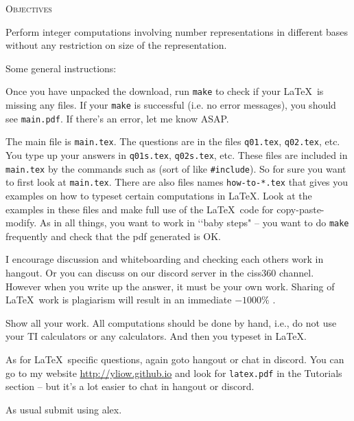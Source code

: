 \textsc{Objectives}
\begin{enumerate}
\li Perform integer computations involving number
representations in different bases without any restriction on size of the
representation.
\end{enumerate}

Some general instructions:
\begin{enumerate}

  \li
  Once you have unpacked the download, run \verb!make! to check if your
  \LaTeX\ is missing any files. If your \verb!make! is successful (i.e. no
  error messages), you should see \verb!main.pdf!.
  If there's an error, let me know ASAP.
  
  \li
  The main file is \verb!main.tex!.
  The questions are in the files
  \verb!q01.tex!,
  \verb!q02.tex!, etc.
  You type up your answers in
  \verb!q01s.tex!,
  \verb!q02s.tex!, etc.
  These files are included in \verb!main.tex! by the commands
  such as
  \verb!! (sort of like \verb!#include!).
  So for sure you want to first look at \verb!main.tex!.
  There are also files names \verb!how-to-*.tex! that gives you examples
  on how to typeset certain computations in \LaTeX.
  Look at the examples in these files and make full use of the \LaTeX\ code
  for copy-paste-modify.
  As in all things, you want to work in \lq\lq baby steps" --
  you want to do \verb!make! frequently and check that the pdf generated is OK.


  \li
  I encourage discussion and whiteboarding and checking each others work
  in hangout.
  Or you can discuss on our discord server
  in the ciss360 channel.
  However when you write up the answer,
  it must be your own work.
  Sharing of \LaTeX\ work is plagiarism will result in an immediate $-1000\%$    .

  \li
  Show all your work. All computations should be done by hand, i.e.,
  do not use your TI calculators or any calculators.
  And then you typeset in \LaTeX.

  \li
  As for \LaTeX\ specific questions, again goto hangout or chat in discord.
  You can go to my website \url{http://yliow.github.io}
  and look for \verb!latex.pdf! in the Tutorials section --
  but it's a lot easier to chat in hangout or discord.
  
  \li
  As usual submit using alex.
  
\end{enumerate}
